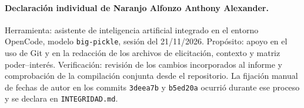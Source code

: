 \paragraph{Declaraci\'on individual de Naranjo Alfonzo Anthony Alexander.} Herramienta: asistente de inteligencia artificial integrado en el entorno OpenCode, modelo \texttt{big-pickle}, sesi\'on del 21/11/2026. Prop\'osito: apoyo en el uso de Git y en la redacci\'on de los archivos de elicitaci\'on, contexto y matriz poder--inter\'es. Verificaci\'on: revisi\'on de los cambios incorporados al informe y comprobaci\'on de la compilaci\'on conjunta desde el repositorio. La fijaci\'on manual de fechas de autor en los commits \texttt{3deea7b} y \texttt{b5ed20a} ocurri\'o durante ese proceso y se declara en \texttt{INTEGRIDAD.md}.
